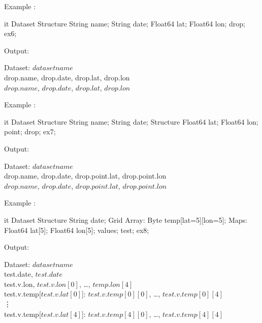 \documentclass{article}
\begin{document}
\begin{enumerate}
\T\begin{minipage}{5in}
Example :
\T\medskip

\begin{vcode}{it}
Dataset {
  Structure {
    String name;
    String date;
    Float64 lat;
    Float64 lon;
  } drop;
} ex6;
\end{vcode}
\T\medskip

Output:\\
\begin{ttfamily}
Dataset: $dataset name$\\
drop.name, drop.date, drop.lat, drop.lon\\
$drop.name$, $drop.date$, $drop.lat$, $drop.lon$
\end{ttfamily}
\T\end{minipage}
\T\bigskip

\T\begin{minipage}{5in}
Example :
\T\medskip

\begin{vcode}{it}
Dataset {
  Structure {
    String name;
    String date;
    Structure {
      Float64 lat;
      Float64 lon;
    } point;
  } drop;
} ex7;
\end{vcode}
\T\medskip

Output:\\
\begin{ttfamily}
Dataset: $dataset name$\\
drop.name, drop.date, drop.point.lat, drop.point.lon\\
$drop.name$, $drop.date$, $drop.point.lat$, $drop.point.lon$
\end{ttfamily}
\T\end{minipage}
\T\bigskip

\T\begin{minipage}{5in}
Example :
\T\medskip

\begin{vcode}{it}
Dataset {
  Structure {
    String date;
    Grid {
      Array: 
      Byte temp[lat=5][lon=5];
      Maps:
      Float64 lat[5];
      Float64 lon[5];
    } values;
  } test;
} ex8;
\end{vcode}
\T\medskip

Output:\\
\begin{ttfamily}
Dataset: $dataset name$\\
test.date, $test.date$\\
test.v.lon, $test.v.lon[0]$, \ldots, $temp.lon[4]$\\
test.v.temp[$test.v.lat[0]$]: $test.v.temp[0][0]$, \ldots, $test.v.temp[0][4]$\\
\vdots\\
test.v.temp[$test.v.lat[4]$]: $test.v.temp[4][0]$, \ldots, $test.v.temp[4][4]$
\end{ttfamily}
\T\end{minipage}
\T\bigskip


\end{enumerate}
\end{document}

